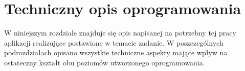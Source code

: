 \chapter{Techniczny opis oprogramowania}
\label{cha:software}

W niniejszym rozdziale znajduje się opis napisanej na potrzebny tej pracy aplikacji realizujące postawione w temacie zadanie. W poszczególnych podrozdziałach opisano wszystkie techniczne aspekty mające wpływ na ostateczny kształt obu poziomów utworzonego oprogramowania.




